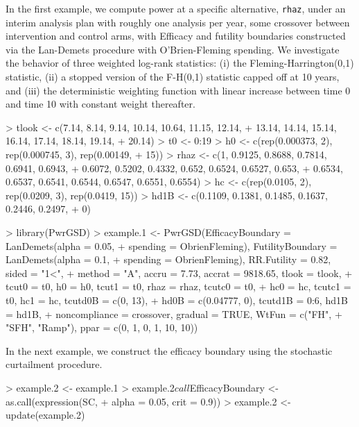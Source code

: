 \documentclass{article}
\begin{document}
In the first example, we compute power at a specific alternative, \verb`rhaz`, under an interim
analysis plan with roughly one analysis per year, some crossover between intervention and
control arms, with Efficacy and futility boundaries constructed via the Lan-Demets
procedure with O'Brien-Fleming spending. We investigate the behavior of three weighted log-rank
statistics: (i) the Fleming-Harrington(0,1) statistic, (ii) a stopped version of the F-H(0,1)
statistic capped off at 10 years, and (iii) the deterministic weighting function with linear
increase between time 0 and time 10 with constant weight thereafter.

\begin{Schunk}
\begin{Sinput}
> tlook <- c(7.14, 8.14, 9.14, 10.14, 10.64, 11.15, 12.14, 
+     13.14, 14.14, 15.14, 16.14, 17.14, 18.14, 19.14, 
+     20.14)
> t0 <- 0:19
> h0 <- c(rep(0.000373, 2), rep(0.000745, 3), rep(0.00149, 
+     15))
> rhaz <- c(1, 0.9125, 0.8688, 0.7814, 0.6941, 0.6943, 
+     0.6072, 0.5202, 0.4332, 0.652, 0.6524, 0.6527, 0.653, 
+     0.6534, 0.6537, 0.6541, 0.6544, 0.6547, 0.6551, 0.6554)
> hc <- c(rep(0.0105, 2), rep(0.0209, 3), rep(0.0419, 15))
> hd1B <- c(0.1109, 0.1381, 0.1485, 0.1637, 0.2446, 0.2497, 
+     0)
\end{Sinput}
\end{Schunk}

\begin{Schunk}
\begin{Sinput}
> library(PwrGSD)
> example.1 <- PwrGSD(EfficacyBoundary = LanDemets(alpha = 0.05, 
+     spending = ObrienFleming), FutilityBoundary = LanDemets(alpha = 0.1, 
+     spending = ObrienFleming), RR.Futility = 0.82, sided = "1<", 
+     method = "A", accru = 7.73, accrat = 9818.65, tlook = tlook, 
+     tcut0 = t0, h0 = h0, tcut1 = t0, rhaz = rhaz, tcutc0 = t0, 
+     hc0 = hc, tcutc1 = t0, hc1 = hc, tcutd0B = c(0, 13), 
+     hd0B = c(0.04777, 0), tcutd1B = 0:6, hd1B = hd1B, 
+     noncompliance = crossover, gradual = TRUE, WtFun = c("FH", 
+         "SFH", "Ramp"), ppar = c(0, 1, 0, 1, 10, 10))
\end{Sinput}
\end{Schunk}

In the next example, we construct the efficacy boundary using the stochastic curtailment procedure.
\begin{Schunk}
\begin{Sinput}
> example.2 <- example.1
> example.2$call$EfficacyBoundary <- as.call(expression(SC, 
+     alpha = 0.05, crit = 0.9))
> example.2 <- update(example.2)
\end{Sinput}
\end{Schunk}
\end{document}
